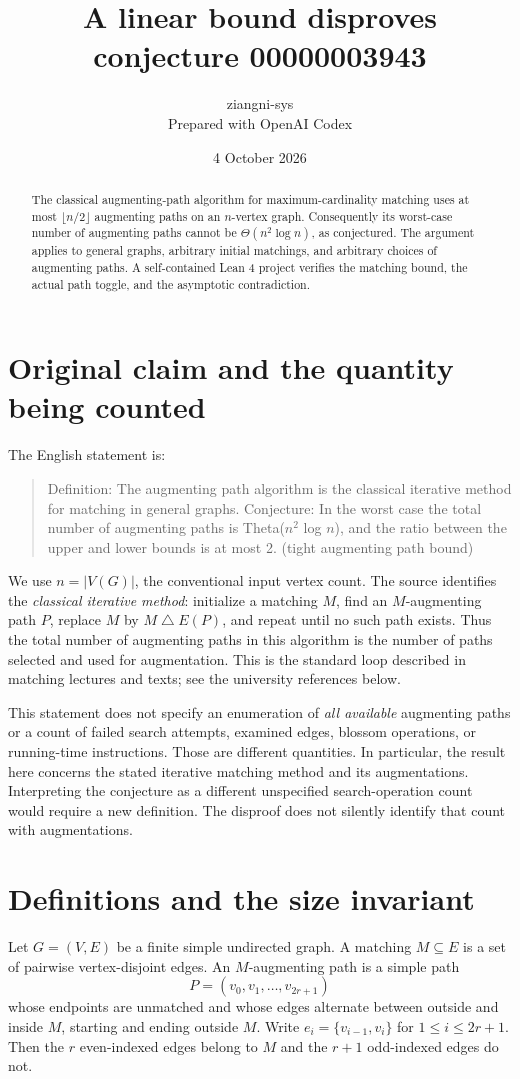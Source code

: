 \documentclass[11pt]{article}
\title{A linear bound disproves conjecture 00000003943}
\author{ziangni-sys\\Prepared with OpenAI Codex}
\date{4 October 2026}
\begin{document}
\maketitle
\begin{abstract}
The classical augmenting-path algorithm for maximum-cardinality matching uses at most $\lfloor n/2\rfloor$ augmenting paths on an $n$-vertex graph. Consequently its worst-case number of augmenting paths cannot be $\Theta(n^2\log n)$, as conjectured. The argument applies to general graphs, arbitrary initial matchings, and arbitrary choices of augmenting paths. A self-contained Lean 4 project verifies the matching bound, the actual path toggle, and the asymptotic contradiction.
\end{abstract}

\section{Original claim and the quantity being counted}
The English statement is:
\begin{quote}
Definition: The augmenting path algorithm is the classical iterative method for matching in general graphs. Conjecture: In the worst case the total number of augmenting paths is Theta($n^2$ log $n$), and the ratio between the upper and lower bounds is at most 2. (tight augmenting path bound)
\end{quote}
We use $n=|V(G)|$, the conventional input vertex count. The source identifies the \emph{classical iterative method}: initialize a matching $M$, find an $M$-augmenting path $P$, replace $M$ by $M\mathbin{\triangle}E(P)$, and repeat until no such path exists. Thus the total number of augmenting paths in this algorithm is the number of paths selected and used for augmentation. This is the standard loop described in matching lectures and texts; see the university references below.

This statement does not specify an enumeration of \emph{all available} augmenting paths or a count of failed search attempts, examined edges, blossom operations, or running-time instructions. Those are different quantities. In particular, the result here concerns the stated iterative matching method and its augmentations. Interpreting the conjecture as a different unspecified search-operation count would require a new definition. The disproof does not silently identify that count with augmentations.

\section{Definitions and the size invariant}
Let $G=(V,E)$ be a finite simple undirected graph. A matching $M\subseteq E$ is a set of pairwise vertex-disjoint edges. An $M$-augmenting path is a simple path
\[
P=(v_0,v_1,\ldots,v_{2r+1})
\]
whose endpoints are unmatched and whose edges alternate between outside and inside $M$, starting and ending outside $M$. Write $e_i=\{v_{i-1},v_i\}$ for $1\le i\le2r+1$. Then the $r$ even-indexed edges belong to $M$ and the $r+1$ odd-indexed edges do not.
\end{document}
